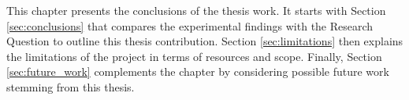 This chapter presents the conclusions of the thesis work. It starts with Section \ref{sec:conclusions} that compares the experimental findings with the Research Question to outline this thesis contribution. Section \ref{sec:limitations} then explains the limitations of the project in terms of resources and scope. Finally, Section \ref{sec:future_work} complements the chapter by considering possible future work stemming from this thesis.